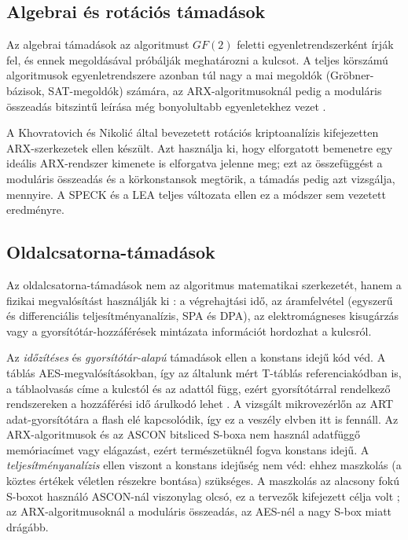 \documentclass[a4paper,12pt]{report}
\theoremstyle{definition}
\theoremstyle{remark}
\begin{document}
\subsection{Algebrai és rotációs támadások}

Az algebrai támadások az algoritmust $GF(2)$ feletti egyenletrendszerként írják fel, és ennek megoldásával próbálják meghatározni a kulcsot. A teljes körszámú algoritmusok egyenletrendszere azonban túl nagy a mai megoldók (Gröbner-bázisok, SAT-megoldók) számára, az ARX-algoritmusoknál pedig a moduláris összeadás bitszintű leírása még bonyolultabb egyenletekhez vezet \cite{Biryukov2017}.

A Khovratovich és Nikolić által bevezetett rotációs kriptoanalízis \cite{Khovratovich2010} kifejezetten ARX-szerkezetek ellen készült. Azt használja ki, hogy elforgatott bemenetre egy ideális ARX-rendszer kimenete is elforgatva jelenne meg; ezt az összefüggést a moduláris összeadás és a körkonstansok megtörik, a támadás pedig azt vizsgálja, mennyire. A SPECK és a LEA teljes változata ellen ez a módszer sem vezetett eredményre.

\subsection{Oldalcsatorna-támadások}

Az oldalcsatorna-támadások nem az algoritmus matematikai szerkezetét, hanem a fizikai megvalósítást használják ki \cite{Kocher1996}: a végrehajtási idő, az áramfelvétel (egyszerű és differenciális teljesítményanalízis, SPA és DPA), az elektromágneses kisugárzás vagy a gyorsítótár-hozzáférések mintázata információt hordozhat a kulcsról.

Az \emph{időzítéses} és \emph{gyorsítótár-alapú} támadások ellen a konstans idejű kód véd. A táblás AES-megvalósításokban, így az általunk mért T-táblás referenciakódban is, a táblaolvasás címe a kulcstól és az adattól függ, ezért gyorsítótárral rendelkező rendszereken a hozzáférési idő árulkodó lehet \cite{Bernstein2005}. A vizsgált mikrovezérlőn az ART adat-gyorsítótára a flash elé kapcsolódik, így ez a veszély elvben itt is fennáll. Az ARX-algoritmusok és az ASCON bitsliced S-boxa nem használ adatfüggő memóriacímet vagy elágazást, ezért természetüknél fogva konstans idejű. A \emph{teljesítményanalízis} ellen viszont a konstans idejűség nem véd: ehhez maszkolás (a köztes értékek véletlen részekre bontása) szükséges. A maszkolás az alacsony fokú S-boxot használó ASCON-nál viszonylag olcsó, ez a tervezők kifejezett célja volt \cite{Dobraunig2021}; az ARX-algoritmusoknál a moduláris összeadás, az AES-nél a nagy S-box miatt drágább.
\end{document}
